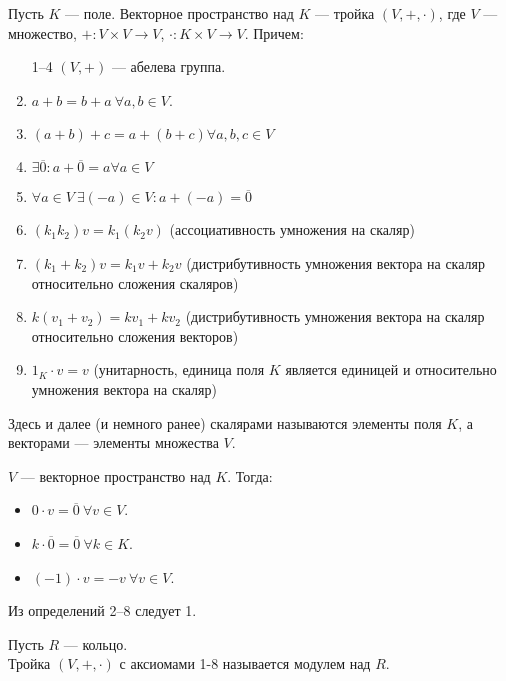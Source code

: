 \begin{definition}
    Пусть $K$ --- поле. Векторное пространство над $K$ --- тройка  $\left( V, +, \cdot \right)$, где  $V$ --- множество,  $+\!: V \times V \to V$,  $\cdot\!: K \times V \to V$. Причем:
     \begin{enumerate}
         \item [1--4] $(V, +)$ --- абелева группа.
     \setcounter{enumi}{0}
     \item $a + b = b+a\ \forall a, b \in V$.
     \item  $(a+b)+c = a+(b+c) \forall a, b, c \in V$
     \item  $\exists \overline{0}\!: a + \overline{0} = a \forall a \in V$
     \item  $\forall a \in V\ \exists (-a) \in V \!: a+(-a) = \overline{0}$
     \item $(k_1k_2)v = k_1(k_2v)$ (ассоциативность умножения на скаляр)
     \item $(k_1+k_2)v = k_1v+k_2v$ (дистрибутивность умножения вектора на скаляр относительно сложения скаляров)
     \item $k(v_1 + v_2) = kv_1 + kv_2$ (дистрибутивность умножения вектора на скаляр относительно сложения векторов)
     \item $1_K \cdot v = v$ (унитарность, единица поля $K$ является единицей и относительно умножения вектора на скаляр)
    \end{enumerate}

    Здесь и далее (и немного ранее) скалярами называются элементы поля $K$, а векторами --- элементы множества $V$.
\end{definition}
\begin{remark}
    $V$ --- векторное пространство над  $K$. Тогда: 
     \begin{itemize}
         \item $0 \cdot v = \overline{0}\ \forall v \in V$.
         \item  $k \cdot \overline{0} = \overline{0}\ \forall k \in K$.
         \item $(-1)\cdot v = -v\ \forall v \in V$.
    \end{itemize}
\end{remark}
\begin{remark}
    Из определений 2--8 следует 1.
\end{remark}
\begin{definition}
    Пусть $R$ --- кольцо. \\
    Тройка  $\left(V, +, \cdot\right)$ с аксиомами 1-8 называется модулем над $R$.
\end{definition}
